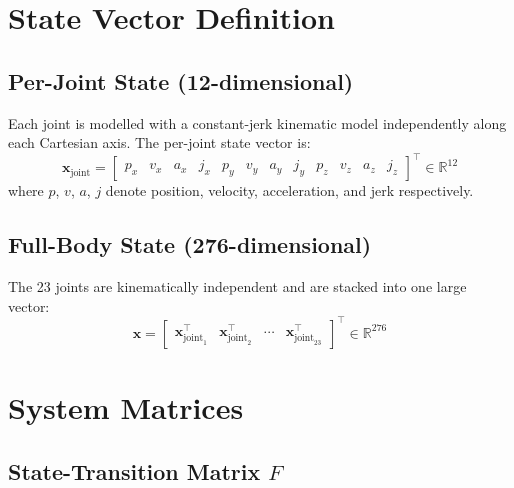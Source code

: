 \documentclass[11pt, a4paper]{article}
\begin{document}
\section{State Vector Definition}

\subsection{Per-Joint State (12-dimensional)}

Each joint is modelled with a constant-jerk kinematic model independently along each
Cartesian axis. The per-joint state vector is:
\begin{equation}
  \mathbf{x}_\text{joint} =
  \begin{bmatrix}
    p_x & v_x & a_x & j_x & p_y & v_y & a_y & j_y & p_z & v_z & a_z & j_z
  \end{bmatrix}^\top \in \mathbb{R}^{12}
\end{equation}
where $p$, $v$, $a$, $j$ denote position, velocity, acceleration, and jerk respectively.

\subsection{Full-Body State (276-dimensional)}

The 23 joints are kinematically independent and are stacked into one large vector:
\begin{equation}
  \mathbf{x} =
  \begin{bmatrix}
    \mathbf{x}_{\text{joint}_1}^\top &
    \mathbf{x}_{\text{joint}_2}^\top &
    \cdots &
    \mathbf{x}_{\text{joint}_{23}}^\top
  \end{bmatrix}^\top \in \mathbb{R}^{276}
\end{equation}

\section{System Matrices}

\subsection{State-Transition Matrix \texorpdfstring{$F$}{F}}
\end{document}
